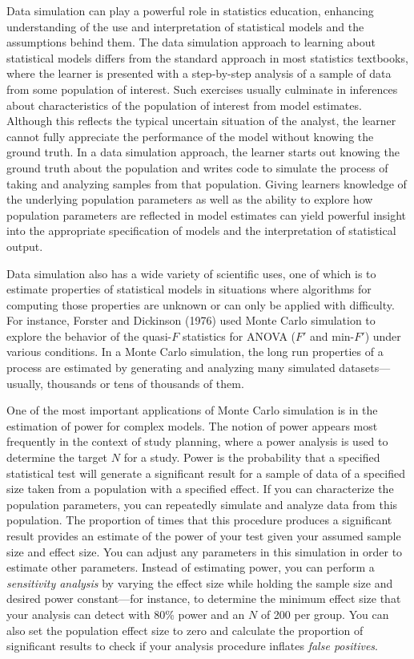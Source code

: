 \documentclass[
  english,
  doc,floatsintext]{apa6}
\begin{document}
Data simulation can play a powerful role in statistics education, enhancing understanding of the use and interpretation of statistical models and the assumptions behind them. The data simulation approach to learning about statistical models differs from the standard approach in most statistics textbooks, where the learner is presented with a step-by-step analysis of a sample of data from some population of interest. Such exercises usually culminate in inferences about characteristics of the population of interest from model estimates. Although this reflects the typical uncertain situation of the analyst, the learner cannot fully appreciate the performance of the model without knowing the ground truth. In a data simulation approach, the learner starts out knowing the ground truth about the population and writes code to simulate the process of taking and analyzing samples from that population. Giving learners knowledge of the underlying population parameters as well as the ability to explore how population parameters are reflected in model estimates can yield powerful insight into the appropriate specification of models and the interpretation of statistical output.

Data simulation also has a wide variety of scientific uses, one of which is to estimate properties of statistical models in situations where algorithms for computing those properties are unknown or can only be applied with difficulty. For instance, Forster and Dickinson (1976) used Monte Carlo simulation to explore the behavior of the quasi-\(F\) statistics for ANOVA (\(F'\) and min-\(F'\)) under various conditions. In a Monte Carlo simulation, the long run properties of a process are estimated by generating and analyzing many simulated datasets---usually, thousands or tens of thousands of them.

One of the most important applications of Monte Carlo simulation is in the estimation of power for complex models. The notion of power appears most frequently in the context of study planning, where a power analysis is used to determine the target \(N\) for a study. Power is the probability that a specified statistical test will generate a significant result for a sample of data of a specified size taken from a population with a specified effect. If you can characterize the population parameters, you can repeatedly simulate and analyze data from this population. The proportion of times that this procedure produces a significant result provides an estimate of the power of your test given your assumed sample size and effect size. You can adjust any parameters in this simulation in order to estimate other parameters. Instead of estimating power, you can perform a \emph{sensitivity analysis} by varying the effect size while holding the sample size and desired power constant---for instance, to determine the minimum effect size that your analysis can detect with 80\% power and an \(N\) of 200 per group. You can also set the population effect size to zero and calculate the proportion of significant results to check if your analysis procedure inflates \emph{false positives}.
\end{document}
